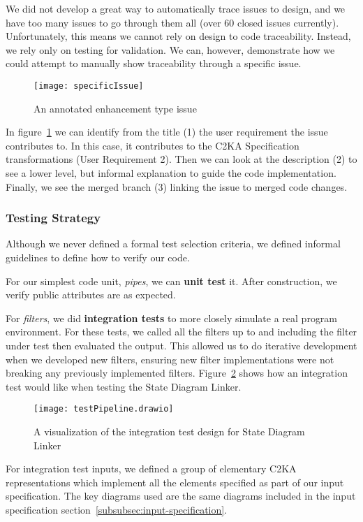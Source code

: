 We did not develop a great way to automatically trace issues to design,
and we have too many issues to go through them all (over 60 closed issues currently).
Unfortunately, this means we cannot rely on design to code traceability.
Instead, we rely only on testing for validation.
We can, however, demonstrate how we could attempt to manually show traceability through a specific issue.
\begin{figure}[h]
    \centering
    \texttt{[image: specificIssue]}
    \caption{An annotated enhancement type issue}
    \label{fig:specificIssue}
\end{figure}
In figure~\ref{fig:specificIssue} we can identify from the title (1) the user requirement the issue contributes to.
In this case, it contributes to the C2KA Specification transformations (User Requirement 2).
Then we can look at the description (2) to see a lower level, but informal explanation to guide the code implementation.
Finally, we see the merged branch (3) linking the issue to merged code changes.

\newpage
\subsubsection{Testing Strategy}\label{subsubsec:tests-strat}
Although we never defined a formal test selection criteria,
we defined informal guidelines to define how to verify our code.

For our simplest code unit, \textit{pipes}, we can \textbf{unit test} it.
After construction, we verify public attributes are as expected.

For \textit{filters}, we did \textbf{integration tests} to more closely simulate a real program environment.
For these tests, we called all the filters up to and including the filter under test then evaluated the output.
This allowed us to do iterative development when we developed new filters,
ensuring new filter implementations were not breaking any previously implemented filters.
Figure~\ref{fig:testShowcase} shows how an integration test would like when testing the State Diagram Linker.
\begin{figure}[h]
    \centering
    \texttt{[image: testPipeline.drawio]}
    \caption{A visualization of the integration test design for State Diagram Linker}
    \label{fig:testShowcase}
\end{figure}

For integration test inputs, we defined a group of elementary C2KA representations which implement
all the elements specified as part of our input specification.
The key diagrams used are the same diagrams included in the input specification section~\ref{subsubsec:input-specification}.

